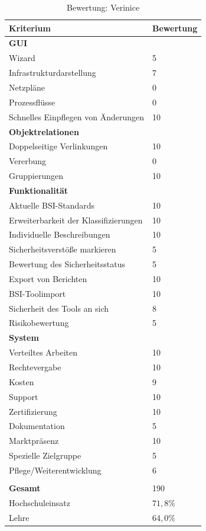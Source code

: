 \begin{table}[h]
\begin{tabular}{|p{}|p{}|}
\hline 
Kriterium & Bewertung\\ 
\hline 
\textbf{GUI}& \\
\hline
Wizard & 5\\
\hline 
Infrastrukturdarstellung & 7 \\
\hline 
Netzpläne & 0 \\
\hline 
Prozessflüsse & 0 \\
\hline 
Schnelles Einpflegen von Änderungen & 10 \\
\hline
\textbf{Objektrelationen} & \\
\hline 
Doppelseitige Verlinkungen & 10 \\
\hline 
Vererbung & 0 \\
\hline 
Gruppierungen & 10 \\
\hline 
\textbf{Funktionalität} &\\
\hline 
Aktuelle BSI-Standards & 10 \\
\hline  
Erweiterbarkeit der Klassifizierungen & 10 \\
\hline 
Individuelle Beschreibungen & 10 \\
\hline 
Sicherheitsverstöße markieren & 5 \\
\hline
Bewertung des Sicherheitsstatus & 5 \\
\hline
Export von Berichten & 10 \\
\hline
BSI-Toolimport & 10 \\
\hline
Sicherheit des Tools an sich & 8 \\
\hline
Risikobewertung & 5 \\
\hline
\textbf{System}&  \\
\hline
Verteiltes Arbeiten & 10 \\
\hline
Rechtevergabe & 10 \\
\hline
Kosten & 9 \\
\hline
Support & 10 \\
\hline
Zertifizierung & 10 \\
\hline
Dokumentation & 5 \\
\hline
Marktpräsenz & 10 \\
\hline
Spezielle Zielgruppe & 5 \\
\hline
Pflege/Weiterentwicklung & 6 \\
\hline
\multicolumn{2}{c}{}\\
\hline
\textbf{Gesamt} & 190\\
\hline
Hochschuleinsatz & $71,8\%$\\
\hline
Lehre & $64,0\%$\\
\hline
\end{tabular} 
\caption{Bewertung: Verinice}
\label{tab:BerwertungVerinice}
\end{table}








